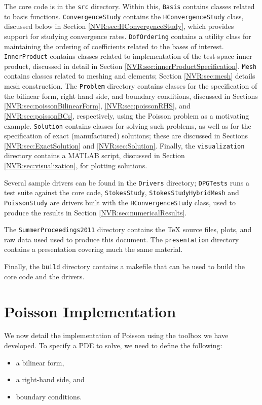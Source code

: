 The core code is in the \verb=src= directory.  Within this, \verb=Basis= contains classes related to basis functions.  \verb=ConvergenceStudy= contains the \verb=HConvergenceStudy= class, discussed below in Section \ref{NVR:sec:HConvergenceStudy}, which provides support for studying convergence rates.  \verb=DofOrdering= contains a utility class for maintaining the ordering of coefficients related to the bases of interest.  \verb=InnerProduct= contains classes related to implementation of the test-space inner product, discussed in detail in Section \ref{NVR:sec:innerProductSpecification}.  \verb=Mesh= contains classes related to meshing and elements; Section \ref{NVR:sec:mesh} details mesh construction.  The \verb=Problem= directory contains classes for the specification of the bilinear form, right hand side, and boundary conditions, discussed in Sections \ref{NVR:sec:poissonBilinearForm}, \ref{NVR:sec:poissonRHS}, and \ref{NVR:sec:poissonBCs}, respectively, using the Poisson problem as a motivating example.  \verb=Solution= contains classes for solving such problems, as well as for the specification of exact (manufactured) solutions; these are discussed in Sections \ref{NVR:sec:ExactSolution} and \ref{NVR:sec:Solution}.  Finally, the \verb=visualization= directory contains a MATLAB script, discussed in Section \ref{NVR:sec:visualization}, for plotting solutions.

Several sample drivers can be found in the \verb=Drivers= directory; \verb=DPGTests= runs a test suite against the core code, \verb=StokesStudy=, \verb=StokesStudyHybridMesh= and \verb=PoissonStudy= are drivers built with the \verb=HConvergenceStudy= class, used to produce the results in Section \ref{NVR:sec:numericalResults}.

The \verb=SummerProceedings2011= directory contains the TeX source files, plots, and raw data used used to produce this document.  The \verb=presentation= directory contains a presentation covering much the same material.

Finally, the \verb=build= directory contains a makefile that can be used to build the core code and the drivers.

\section{Poisson Implementation}\label{NVR:sec:poissonImplementation}
We now detail the implementation of Poisson using the toolbox we have developed.  To specify a PDE to solve, we need to define the following:
\begin{itemize}
\item a bilinear form,
\item a right-hand side, and
\item boundary conditions.
\end{itemize}

